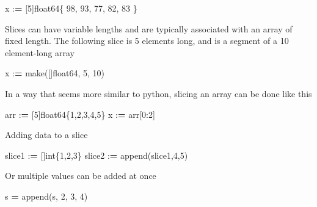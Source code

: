\documentclass[]{book}
\newenvironment{Shaded}{\begin{snugshade}}{\end{snugshade}}
\newcommand{\DecValTok}[1]{\textcolor[rgb]{0.00,0.00,0.81}{#1}}
\newcommand{\OperatorTok}[1]{\textcolor[rgb]{0.81,0.36,0.00}{\textbf{#1}}}
\newcommand{\BuiltInTok}[1]{#1}
\newcommand{\NormalTok}[1]{#1}
\begin{document}
\begin{Shaded}
\begin{Highlighting}[]
\NormalTok{x :}\OperatorTok{=}\NormalTok{ [}\DecValTok{5}\NormalTok{]float64\{ }\DecValTok{98}\NormalTok{, }\DecValTok{93}\NormalTok{, }\DecValTok{77}\NormalTok{, }\DecValTok{82}\NormalTok{, }\DecValTok{83}\NormalTok{ \}}
\end{Highlighting}
\end{Shaded}

Slices can have variable lengths and are typically associated with an
array of fixed length. The following slice is 5 elements long, and is a
segment of a 10 element-long array

\begin{Shaded}
\begin{Highlighting}[]
\NormalTok{x :}\OperatorTok{=}\NormalTok{ make([]float64, }\DecValTok{5}\NormalTok{, }\DecValTok{10}\NormalTok{)}
\end{Highlighting}
\end{Shaded}

In a way that seems more similar to python, slicing an array can be done
like this

\begin{Shaded}
\begin{Highlighting}[]
\NormalTok{arr :}\OperatorTok{=}\NormalTok{ [}\DecValTok{5}\NormalTok{]float64\{}\DecValTok{1}\NormalTok{,}\DecValTok{2}\NormalTok{,}\DecValTok{3}\NormalTok{,}\DecValTok{4}\NormalTok{,}\DecValTok{5}\NormalTok{\}}
\NormalTok{x :}\OperatorTok{=}\NormalTok{ arr[}\DecValTok{0}\NormalTok{:}\DecValTok{2}\NormalTok{]}
\end{Highlighting}
\end{Shaded}

Adding data to a slice

\begin{Shaded}
\begin{Highlighting}[]
\NormalTok{slice1 :}\OperatorTok{=}\NormalTok{ []}\BuiltInTok{int}\NormalTok{\{}\DecValTok{1}\NormalTok{,}\DecValTok{2}\NormalTok{,}\DecValTok{3}\NormalTok{\}}
\NormalTok{slice2 :}\OperatorTok{=}\NormalTok{ append(slice1,}\DecValTok{4}\NormalTok{,}\DecValTok{5}\NormalTok{)}
\end{Highlighting}
\end{Shaded}

Or multiple values can be added at once

\begin{Shaded}
\begin{Highlighting}[]
\NormalTok{s }\OperatorTok{=}\NormalTok{ append(s, }\DecValTok{2}\NormalTok{, }\DecValTok{3}\NormalTok{, }\DecValTok{4}\NormalTok{)}
\end{Highlighting}
\end{Shaded}
\end{document}
